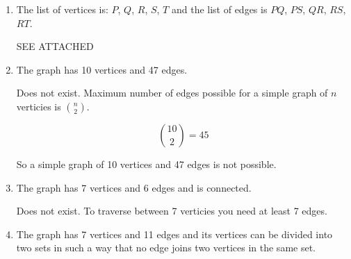 \documentclass[11pt]{article}
\begin{document}
\begin{enumerate}[label= (\alph*)]
  \item The list of vertices is: $P$, $Q$, $R$, $S$, $T$ and the list of edges
    is $PQ$, $PS$, $QR$, $RS$, $RT$.

  SEE ATTACHED

  \item The graph has 10 vertices and 47 edges.

  Does not exist. Maximum number of edges possible for a simple graph of $n$
    verticies is $\binom{n}{2}$.

  \[ \binom{10}{2} = 45 \]

  So a simple graph of 10 vertices and 47 edges is not possible.

  \item The graph has 7 vertices and 6 edges and is connected.

  Does not exist. To traverse between 7 verticies you need at least 7 edges.

  \item The graph has 7 vertices and 11 edges and its vertices can be divided
  into two sets in such a way that no edge joins two vertices in the same set.

\end{enumerate}
\end{document}

